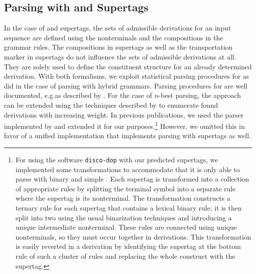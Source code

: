 \documentclass[../../document.tex]{subfiles}
\begin{document}
    \subsection{Parsing with  and  Supertags}\label{sec:parsing:lcfrs}
    In the case of  and  supertags, the sets of admissible derivations for an input sequence are defined using the nonterminals and the  compositions in the grammar rules.
    The  compositions in  supertags as well as the transportation marker in  supertags do not influence the sets of admissible derivations at all.
    They are solely used to define the constituent structure for an already determined derivation.
    With both formalisms, we exploit statistical parsing procedures for  as \citet{Geb20} did in the case of parsing with hybrid grammars.
    Parsing procedures for  are well documented, e.g.\@ as described by \citet[Section~7.1]{Kal10}.
    For the case of \(n\)-best parsing, the approach can be extended using the techniques described by \citet{HuaChia05} to enumerate found derivations with increasing weight.
    In previous publications, we used the  parser implemented by \citet{CraSchBod16} and extended it for our purposes.\footnote{
        For using the software \texttt{disco-dop} \citep{CraSchBod16} with our predicted supertags, we implemented some transformations to accommodate that it is only able to parse with binary and simple .
        Each supertag is transformed into a collection of appropriate rules by splitting the terminal symbol into a separate rule where the supertag is its  nonterminal.
        The transformation constructs a ternary rule for each supertag that contains a lexical binary rule; it is then split into two using the usual binarization techniques and introducing a unique intermediate nonterminal.
        These rules are connected using unique nonterminals, so they must occur together in derivations.
        This transformation is easily reverted in a derivation by identifying the supertag at the bottom rule of such a cluster of rules and replacing the whole construct with the supertag.
    }
    However, we omitted this in favor of a unified implementation that implements parsing with  supertags as well.
\end{document}
